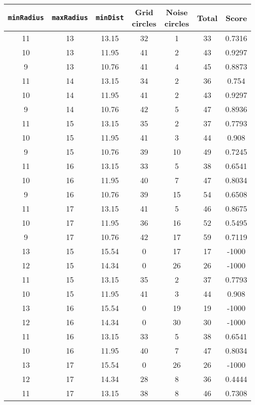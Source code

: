 \documentclass[letterpaper, 12pt]{article}
\begin{document}
\begin{longtable}{|c|c|c|c|c|c|c|}
\hline
\textbf{\texttt{minRadius}} & \textbf{\texttt{maxRadius}} & \textbf{\texttt{minDist}} & \textbf{Grid circles} & \textbf{Noise circles} & \textbf{Total} & \textbf{Score} \\
\hline
11 & 13 & 13.15 & 32 & 1 & 33 & 0.7316 \\
\hline
10 & 13 & 11.95 & 41 & 2 & 43 & 0.9297 \\
\hline
9 & 13 & 10.76 & 41 & 4 & 45 & 0.8873 \\
\hline
11 & 14 & 13.15 & 34 & 2 & 36 & 0.754 \\
\hline
10 & 14 & 11.95 & 41 & 2 & 43 & 0.9297 \\
\hline
9 & 14 & 10.76 & 42 & 5 & 47 & 0.8936 \\
\hline
11 & 15 & 13.15 & 35 & 2 & 37 & 0.7793 \\
\hline
10 & 15 & 11.95 & 41 & 3 & 44 & 0.908 \\
\hline
9 & 15 & 10.76 & 39 & 10 & 49 & 0.7245 \\
\hline
11 & 16 & 13.15 & 33 & 5 & 38 & 0.6541 \\
\hline
10 & 16 & 11.95 & 40 & 7 & 47 & 0.8034 \\
\hline
9 & 16 & 10.76 & 39 & 15 & 54 & 0.6508 \\
\hline
11 & 17 & 13.15 & 41 & 5 & 46 & 0.8675 \\
\hline
10 & 17 & 11.95 & 36 & 16 & 52 & 0.5495 \\
\hline
9 & 17 & 10.76 & 42 & 17 & 59 & 0.7119 \\
\hline
13 & 15 & 15.54 & 0 & 17 & 17 & -1000 \\
\hline
12 & 15 & 14.34 & 0 & 26 & 26 & -1000 \\
\hline
11 & 15 & 13.15 & 35 & 2 & 37 & 0.7793 \\
\hline
10 & 15 & 11.95 & 41 & 3 & 44 & 0.908 \\
\hline
13 & 16 & 15.54 & 0 & 19 & 19 & -1000 \\
\hline
12 & 16 & 14.34 & 0 & 30 & 30 & -1000 \\
\hline
11 & 16 & 13.15 & 33 & 5 & 38 & 0.6541 \\
\hline
10 & 16 & 11.95 & 40 & 7 & 47 & 0.8034 \\
\hline
13 & 17 & 15.54 & 0 & 26 & 26 & -1000 \\
\hline
12 & 17 & 14.34 & 28 & 8 & 36 & 0.4444 \\
\hline
11 & 17 & 13.15 & 38 & 8 & 46 & 0.7308 \\
\hline

\end{longtable}
\end{document}
